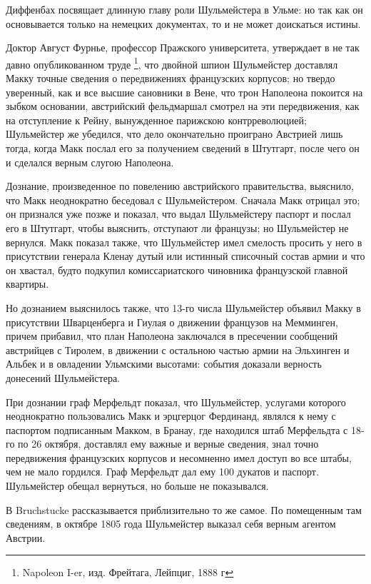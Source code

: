 \documentclass[
  oneside,
  12pt,
  titlepage]{book}
\begin{document}
Диффенбах посвящает длинную главу роли Шульмейстера в Ульме: но так как он основывается только на немецких документах, то и не может доискаться истины.

Доктор Август Фурнье, профессор Пражского университета, утверждает в не так давно опубликованном труде \footnote{Napoleon I-er, изд. Фрейтага, Лейпциг, 1888 г}, что двойной шпион Шульмейстер доставлял Макку точные сведения о передвижениях французских корпусов; но твердо уверенный, как и все высшие сановники в Вене, что трон Наполеона покоится на зыбком основании, австрийский фельдмаршал смотрел на эти передвижения, как на отступление к Рейну, вынужденное парижскою контрреволюцией; Шульмейстер же убедился, что дело окончательно проиграно Австрией лишь тогда, когда Макк послал его за получением сведений в Штутгарт, после чего он и сделался верным слугою Наполеона.

Дознание, произведенное по повелению австрийского правительства, выяснило, что Макк неоднократно беседовал с Шульмейстером. Сначала Макк отрицал это; он признался уже позже и показал, что выдал Шульмейстеру паспорт и послал его в Штутгарт, чтобы выяснить, отступают ли французы; но Шульмейстер не вернулся. Макк показал также, что Шульмейстер имел смелость просить у него в присутствии генерала Кленау дутый или истинный списочный состав армии и что он хвастал, будто подкупил комиссариатского чиновника французской главной квартиры.

Но дознанием выяснилось также, что 13-го числа Шульмейстер объявил Макку в присутствии Шварценберга и Гиулая о движении французов на Мемминген, причем прибавил, что план Наполеона заключался в пресечении сообщений австрийцев с Тиролем, в движении с остальною частью армии на Эльхинген и Альбек и в овладении Ульмскими высотами: события доказали верность донесений Шульмейстера.

При дознании граф Мерфельдт показал, что Шульмейстер, услугами которого неоднократно пользовались Макк и эрцгерцог Фердинанд, являлся к нему с паспортом подписанным Макком, в Бранау, где находился штаб Мерфельдта с 18-го по 26 октября, доставлял ему важные и верные сведения, знал точно передвижения французских корпусов и несомненно имел доступ во все штабы, чем не мало гордился. Граф Мерфельдт дал ему 100 дукатов и паспорт. Шульмейстер обещал вернуться, но больше не показывался.

В Bruchstucke рассказывается приблизительно то же самое. По помещенным там сведениям, в октябре 1805 года Шульмейстер выказал себя верным агентом Австрии.
\end{document}
